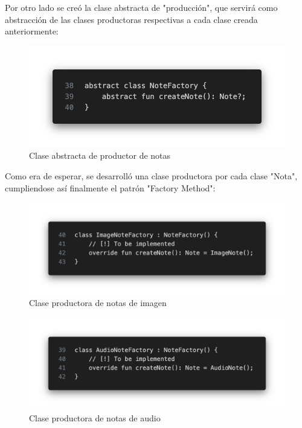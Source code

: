 \documentclass{article}
\begin{document}
        Por otro lado se creó la clase abstracta de "producción", que servirá como abstracción
         de las clases productoras respectivas a cada clase creada anteriormente:

        \begin{figure}[H]
            \centerline{\includegraphics[scale=0.3]{note_factory.png}}
            \caption{Clase abstracta de productor de notas}
            \label{fig:note_factory}
        \end{figure}

        Como era de esperar, se desarrolló una clase productora por cada clase "Nota",
         cumpliendose así finalmente el patrón "Factory Method":

        \begin{figure}[H]
            \centerline{\includegraphics[scale=0.3]{image_note_factory.png}}
            \caption{Clase productora de notas de imagen}
            \label{fig:image_note_factory}
        \end{figure}

        \begin{figure}[H]
            \centerline{\includegraphics[scale=0.3]{audio_note_factory.png}}
            \caption{Clase productora de notas de audio}
            \label{fig:audio_note_factory}
        \end{figure}
\end{document}
